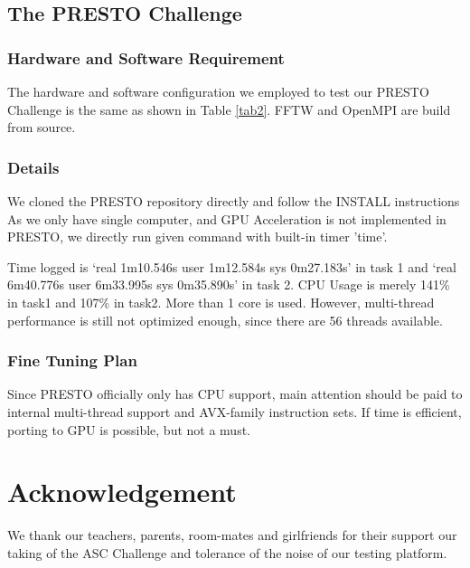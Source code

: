 \documentclass[a4paper, 11pt]{article}
\begin{document}
		\subsection{The PRESTO Challenge} 
		
			\subsubsection{Hardware and Software Requirement}
			
				The hardware and software configuration we employed to test our PRESTO Challenge is the same as shown in Table \ref{tab2}. FFTW and OpenMPI are build from source. 

			\subsubsection{Details}
			
				We cloned the PRESTO repository directly and follow the INSTALL instructions As we only have single computer, and GPU Acceleration is not implemented in PRESTO, we directly run given command with built-in timer ’time’. 
				
				Time logged is ‘real 1m10.546s user 1m12.584s sys 0m27.183s’ in task 1 and ‘real 6m40.776s user	6m33.995s sys 0m35.890s’ in task 2. CPU Usage is merely 141\% in task1 and 107\% in task2. More than 1 core is used. However, multi-thread performance is still not optimized enough, since there are 56 threads available. 
			
			\subsubsection{Fine Tuning Plan}
				
				Since PRESTO officially only has CPU support, main attention should be paid to internal multi-thread support and AVX-family instruction sets. If time is efficient, porting to GPU is possible, but not a must. 
				
			
	\section*{Acknowledgement} We thank our teachers, parents, room-mates and girlfriends for their support our taking of the ASC Challenge and tolerance of the noise of our testing platform.



\end{document}
